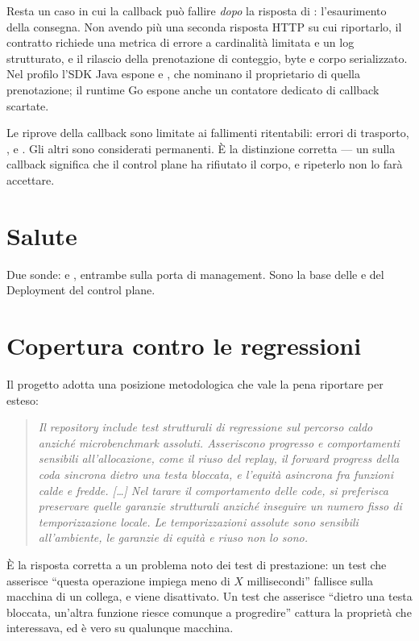 Resta un caso in cui la callback pu\`o fallire \emph{dopo} la risposta di
: l'esaurimento della consegna. Non avendo pi\`u una seconda
risposta HTTP su cui riportarlo, il contratto richiede una metrica di errore a
cardinalit\`a limitata e un log strutturato, e il rilascio della prenotazione di
conteggio, byte e corpo serializzato. Nel profilo  l'SDK Java
espone  e ,
che nominano il proprietario di quella prenotazione; il runtime Go espone anche un
contatore dedicato di callback scartate.

Le riprove della callback sono limitate ai fallimenti ritentabili: errori di
trasporto, ,  e . Gli altri  sono
considerati permanenti. \`E la distinzione corretta --- un  sulla
callback significa che il control plane ha rifiutato il corpo, e ripeterlo non
lo far\`a accettare.

\section{Salute}

Due sonde:  e
, entrambe sulla porta di management. Sono la
base delle  e  del Deployment del
control plane.

\section{Copertura contro le regressioni}

Il progetto adotta una posizione metodologica che vale la pena riportare per
esteso:

\begin{quote}\itshape
Il repository include test strutturali di regressione sul percorso caldo anzich\'e
microbenchmark assoluti. Asseriscono progresso e comportamenti sensibili
all'allocazione, come il riuso del replay, il forward progress della coda
sincrona dietro una testa bloccata, e l'equit\`a asincrona fra funzioni calde e
fredde. [\ldots] Nel tarare il comportamento delle code, si preferisca
preservare quelle garanzie strutturali anzich\'e inseguire un numero fisso di
temporizzazione locale. Le temporizzazioni assolute sono sensibili all'ambiente,
le garanzie di equit\`a e riuso non lo sono.
\end{quote}

\`E la risposta corretta a un problema noto dei test di prestazione: un test che
asserisce ``questa operazione impiega meno di $X$ millisecondi'' fallisce sulla
macchina di un collega, e viene disattivato. Un test che asserisce ``dietro una
testa bloccata, un'altra funzione riesce comunque a progredire'' cattura la
propriet\`a che interessava, ed \`e vero su qualunque macchina.
